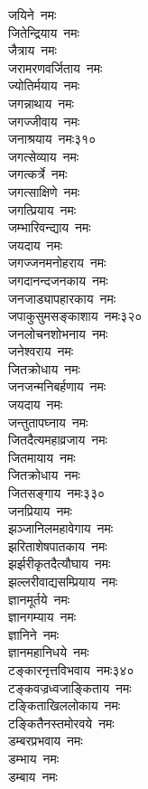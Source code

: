 \begin{multicols}{\maxColumns}
\begin{flushleft}
जयिने~नमः\\
जितेन्द्रियाय~नमः\\
जैत्राय~नमः\\
जरामरणवर्जिताय~नमः\\
ज्योतिर्मयाय~नमः\\
जगन्नाथाय~नमः\\
जगज्जीवाय~नमः\\
जनाश्रयाय~नमः\hfill ३१०\\
जगत्सेव्याय~नमः\\
जगत्कर्त्रे~नमः\\
जगत्साक्षिणे~नमः\\
जगत्प्रियाय~नमः\\
जम्भारिवन्द्याय~नमः\\
जयदाय~नमः\\
जगज्जनमनोहराय~नमः\\
जगदानन्दजनकाय~नमः\\
जनजाड्यापहारकाय~नमः\\
जपाकुसुमसङ्काशाय~नमः\hfill ३२०\\
जनलोचनशोभनाय~नमः\\
जनेश्वराय~नमः\\
जितक्रोधाय~नमः\\
जनजन्मनिबर्हणाय~नमः\\
जयदाय~नमः\\
जन्तुतापघ्नाय~नमः\\
जितदैत्यमहाव्रजाय~नमः\\
जितमायाय~नमः\\
जितक्रोधाय~नमः\\
जितसङ्गाय~नमः\hfill ३३०\\
जनप्रियाय~नमः\\
झञ्जानिलमहावेगाय~नमः\\
झरिताशेषपातकाय~नमः\\
झर्झरीकृतदैत्यौघाय~नमः\\
झल्लरीवाद्यसम्प्रियाय~नमः\\
ज्ञानमूर्तये~नमः\\
ज्ञानगम्याय~नमः\\
ज्ञानिने~नमः\\
ज्ञानमहानिधये~नमः\\
टङ्कारनृत्तविभवाय~नमः\hfill ३४०\\
टङ्कवज्रध्वजाङ्किताय~नमः\\
टङ्किताखिललोकाय~नमः\\
टङ्कितैनस्तमोरवये~नमः\\
डम्बरप्रभवाय~नमः\\
डम्भाय~नमः\\
डम्बाय~नमः\\

\end{flushleft}
\end{multicols}
